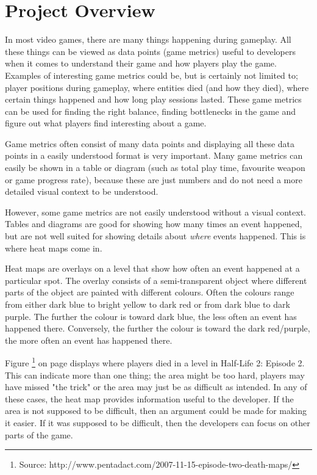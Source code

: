 \section{Project Overview}
\label{PO}
In most video games, there are many things happening during gameplay. All these things can be viewed as data points (game metrics) useful to developers when it comes to understand their game and how players play the game. Examples of interesting game metrics could be, but is certainly not limited to; player positions during gameplay, where entities died (and how they died), where certain things happened and how long play sessions lasted. These game metrics can be used for finding the right balance, finding bottlenecks in the game and figure out what players find interesting about a game.

Game metrics often consist of many data points and displaying all these data points in a easily understood format is very important. Many game metrics can easily be shown in a table or diagram (such as total play time, favourite weapon or game progress rate), because these are just numbers and do not need a more detailed visual context to be understood.

However, some game metrics are not easily understood without a visual context. Tables and diagrams are good for showing how many times an event happened, but are not well suited for showing details about \textit{where} events happened. This is where heat maps come in. 


Heat maps are overlays on a level that show how often an event happened at a particular spot. The overlay consists of a semi-transparent object where different parts of the object are painted with different colours. Often the colours range from either dark blue to bright yellow to dark red or from dark blue to dark purple. The further the colour is toward dark blue, the less often an event has happened there. Conversely, the further the colour is toward the dark red/purple, the more often an event has happened there. 

Figure \footnote{Source: http://www.pentadact.com/2007-11-15-episode-two-death-maps/} on page \pageref{fig:HL_2_HeatMap} displays where players died in a level in Half-Life 2: Episode 2. This can indicate more than one thing; the area might be too hard, players may have missed "the trick" or the area may just be as difficult as intended. In any of these cases, the heat map provides information useful to the developer. If the area is not supposed to be difficult, then an argument could be made for making it easier. If it was supposed to be difficult, then the developers can focus on other parts of the game.

